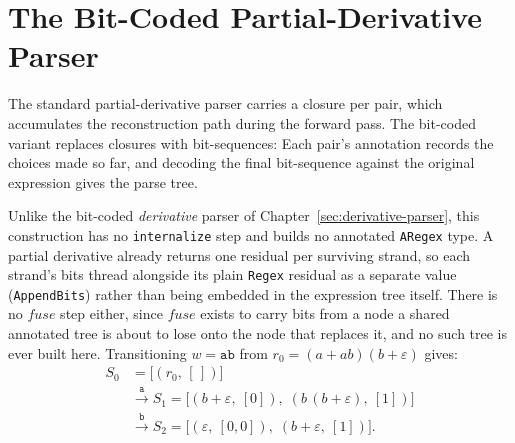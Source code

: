 %
%
%
%
%

\section{The Bit-Coded Partial-Derivative Parser}
\label{sec:pderiv-bc}

The standard partial-derivative parser carries a closure per pair,
which accumulates the reconstruction path during the forward pass. 
The bit-coded variant replaces closures with bit-sequences: 
Each pair's annotation records the choices made so far, 
and decoding the final bit-sequence 
against the original expression gives the parse tree.

Unlike the bit-coded \emph{derivative} parser of Chapter~\ref{sec:derivative-parser}, 
this construction has no \texttt{internalize} step 
and builds no annotated \texttt{ARegex} type. 
A partial derivative already returns one residual per surviving strand, 
so each strand's bits thread 
alongside its plain \texttt{Regex} residual as a separate value 
(\texttt{AppendBits}) 
rather than being embedded in the expression tree itself. 
There is no $\mathit{fuse}$ step either,
since $\mathit{fuse}$ exists to carry bits from a node 
a shared annotated tree is about to lose onto the
node that replaces it, and no such tree is ever built here.
Transitioning $w = \mathtt{ab}$ from $r_0 = (a + ab)(b + \varepsilon)$ gives:
\begin{equation}\label{eq:pderiv-bc-overview}
\begin{aligned}
S_0 &= \bigl[(r_0,\, [\,])\bigr] \\[2pt]
  &\xrightarrow{\ \mathtt{a}\ }
    S_1 = \bigl[
      (b + \varepsilon,\ [0]),\;
      (b\,(b + \varepsilon),\ [1])\bigr] \\[2pt]
  &\xrightarrow{\ \mathtt{b}\ }
    S_2 = \bigl[
      (\varepsilon,\ [0, 0]),\;
      (b + \varepsilon,\ [1])\bigr].
\end{aligned}
\end{equation}

